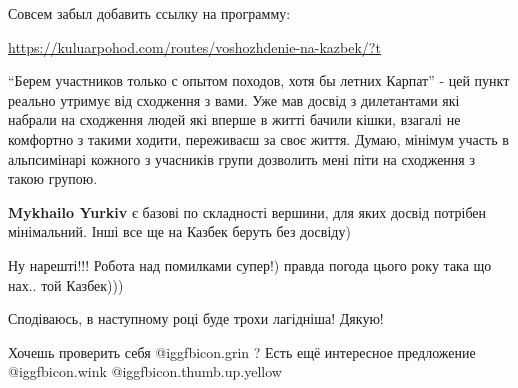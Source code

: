  
 
 
 
 
\zzSecCmt

\begin{itemize} %
Совсем забыл добавить ссылку на программу: 

\url{https://kuluarpohod.com/routes/voshozhdenie-na-kazbek/?t}


\enquote{Берем участников только с опытом походов, хотя бы летних Карпат} - цей пункт
реально утримує від сходження з вами. Уже мав досвід з дилетантами які набрали
на сходження людей які вперше в житті бачили кішки, взагалі не комфортно з
такими ходити, переживаєш за своє життя. Думаю, мінімум участь в альпсимінарі
кожного з учасників групи дозволить мені піти на сходження з такою групою.

\begin{itemize} %
\textbf{Mykhailo Yurkiv} є базові по складності вершини, для яких досвід потрібен мінімальний. Інші все ще на Казбек беруть без досвіду)

\end{itemize} %

Ну нарешті!!! Робота над помилками супер!) правда погода цього року така що нах.. той Казбек)))


Сподіваюсь, в наступному році буде трохи лагідніша! Дякую!

Хочешь проверить себя  @igg{fbicon.grin} ?
Есть ещё интересное предложение  @igg{fbicon.wink}  @igg{fbicon.thumb.up.yellow} 

\end{itemize} %
